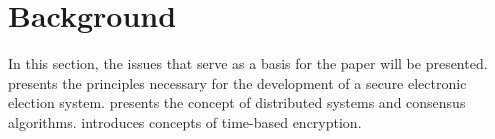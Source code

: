 \documentclass[english]{textolivre}
\begin{document}




\section{Background \label{sec-background}}

In this section, the issues that serve as a basis for the paper will be presented.  presents the principles necessary for the development of a secure electronic election system.  presents the concept of distributed systems and consensus algorithms.  introduces concepts of time-based encryption. %
\end{document}
